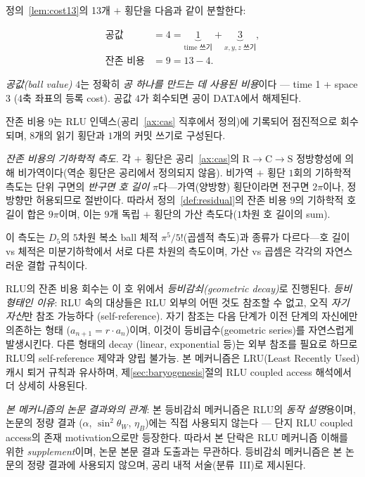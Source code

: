 \documentclass[entropy,article,submit,pdftex,oneauthor]{Definitions/mdpi}
\begin{document}
\begin{Definition}[공값과 잔존 비용]\label{def:residual}
정의~\ref{lem:cost13}의 13개 $+$ 횡단을 다음과 같이 분할한다:
\begin{linenomath}
\begin{align}
\text{공값} &= 4 = \underbrace{1}_{\text{time 쓰기}} + \underbrace{3}_{x,y,z\text{ 쓰기}}, \\
\text{잔존 비용} &= 9 = 13 - 4.
\end{align}
\end{linenomath}
\emph{공값(ball value)} $4$는 정확히 \emph{공 하나를 만드는 데 사용된 비용}이다 — time 1 + space 3 (4축 좌표의 등록 cost). 공값 $4$가 회수되면 공이 DATA에서 해제된다.

잔존 비용 $9$는 RLU 인덱스(공리~\ref{ax:cas} 직후에서 정의)에 기록되어 점진적으로 회수되며, $8$개의 읽기 횡단과 $1$개의 커밋 쓰기로 구성된다.
\end{Definition}

\emph{잔존 비용의 기하학적 측도}\label{rem:geometric-measure}. 각 $+$ 횡단은 공리~\ref{ax:cas}의 $\mathrm{R} \to \mathrm{C} \to \mathrm{S}$ 정방향성에 의해 비가역이다(역순 횡단은 공리에서 정의되지 않음). 비가역 $+$ 횡단 $1$회의 기하학적 측도는 단위 구면의 \emph{반구면 호 길이} $\pi$다---가역(양방향) 횡단이라면 전구면 $2\pi$이나, 정방향만 허용되므로 절반이다. 따라서 정의~\ref{def:residual}의 잔존 비용 $9$의 기하학적 호 길이 합은 $9\pi$이며, 이는 $9$개 독립 $+$ 횡단의 가산 측도다($1$차원 호 길이의 sum).

이 측도는 $D_5$의 $5$차원 복소 ball 체적 $\pi^5/5!$(곱셈적 측도)과 종류가 다르다---호 길이 vs 체적은 미분기하학에서 서로 다른 차원의 측도이며, 가산 vs 곱셈은 각각의 자연스러운 결합 규칙이다.

RLU의 잔존 비용 회수는 이 호 위에서 \emph{등비감쇠(geometric decay)}로 진행된다. \emph{등비 형태인 이유}: RLU 속의 대상들은 RLU 외부의 어떤 것도 참조할 수 없고, 오직 \emph{자기 자신}만 참조 가능하다 (self-reference). 자기 참조는 다음 단계가 이전 단계의 자신에만 의존하는 형태 ($a_{n+1} = r \cdot a_n$)이며, 이것이 등비급수(geometric series)를 자연스럽게 발생시킨다. 다른 형태의 decay (linear, exponential 등)는 외부 참조를 필요로 하므로 RLU의 self-reference 제약과 양립 불가능. 본 메커니즘은 LRU(Least Recently Used) 캐시 퇴거 규칙과 유사하며, 제\ref{sec:baryogenesis}절의 RLU coupled access 해석에서 더 상세히 사용된다.

\emph{본 메커니즘의 논문 결과와의 관계}: 본 등비감쇠 메커니즘은 RLU의 \emph{동작 설명}용이며, 논문의 정량 결과 ($\alpha$, $\sin^2\theta_W$, $\eta_B$)에는 직접 사용되지 않는다 — 단지 RLU coupled access의 존재 motivation으로만 등장한다. 따라서 본 단락은 RLU 메커니즘 이해를 위한 \emph{supplement}이며, 논문 본문 결과 도출과는 무관하다. 등비감쇠 메커니즘은 본 논문의 정량 결과에 사용되지 않으며, 공리 내적 서술(분류~III)로 제시된다.
\end{document}
